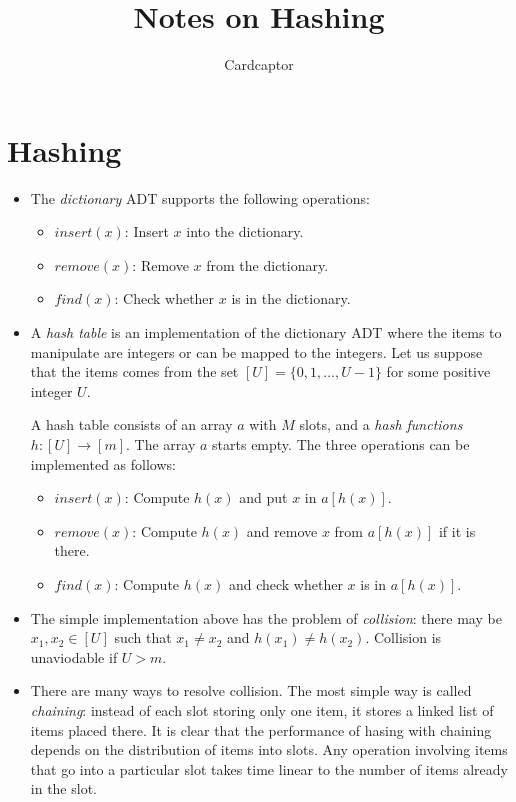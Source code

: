 \documentclass{article}
\title{Notes on Hashing}
\author{Cardcaptor}
\begin{document}
\maketitle

\section{Hashing}
\begin{itemize}
\item The \emph{dictionary} ADT supports the following operations:
\begin{itemize}
\item $insert(x)$: Insert $x$ into the dictionary.
\item $remove(x)$: Remove $x$ from the dictionary.
\item $find(x)$: Check whether $x$ is in the dictionary.
\end{itemize}

\item A \emph{hash table} is an implementation of the dictionary ADT where the items to manipulate are integers or can be mapped to the integers. Let us suppose that the items comes from the set $[U] = \{0, 1, \dotsc, U-1\}$ for some positive integer $U$. 

A hash table consists of an array $a$ with $M$ slots, and a \emph{hash functions} $h: [U] \rightarrow [m].$ The array $a$ starts empty. The three operations can be implemented as follows:
\begin{itemize}
\item $insert(x)$: Compute $h(x)$ and put $x$ in $a[h(x)]$.
\item $remove(x)$: Compute $h(x)$ and remove $x$ from $a[h(x)]$ if it is there.
\item $find(x)$: Compute $h(x)$ and check whether $x$ is in $a[h(x)]$.
\end{itemize}

\item The simple implementation above has the problem of \emph{collision}: there may be $x_1, x_2 \in [U]$ such that $x_1 \neq x_2$ and $h(x_1) \neq h(x_2)$. Collision is unaviodable if $U > m$.

\item There are many ways to resolve collision. The most simple way is called \emph{chaining}: instead of each slot storing only one item, it stores a linked list of items placed there. It is clear that the performance of hasing with chaining depends on the distribution of items into slots. Any operation involving items that go into a particular slot takes time linear to the number of items already in the slot.


\end{itemize}
\end{document}
